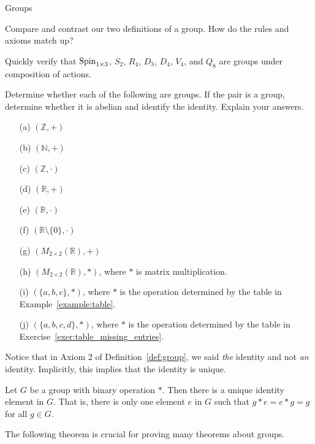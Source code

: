 \begin{section}{Groups}
\begin{exercise}
Compare and contrast our two definitions of a group.  How do the rules and axioms match up?
\end{exercise}

\begin{exercise}
Quickly verify that \(\operatorname{Spin}_{1\times 3}\), \(S_2\), \(R_4\), \(D_3\), \(D_4\), \(V_4\), and \(Q_8\) are groups under composition of actions.
\end{exercise}

\begin{exercise}
Determine whether each of the following are groups.  If the pair is a group, determine whether it is abelian and identify the identity.  Explain your answers.
\begin{enumerate}
\item[(a)] \((\mathbb{Z},+)\)
\item[(b)] \((\mathbb{N},+)\)
\item[(c)] \((\mathbb{Z},\cdot)\)
\item[(d)] \((\mathbb{R},+)\)
\item[(e)] \((\mathbb{R},\cdot)\)
\item[(f)] \((\mathbb{R}\setminus \{0\},\cdot)\)
\item[(g)] \((M_{2\times 2}(\mathbb{R}),+)\)
\item[(h)] \((M_{2\times 2}(\mathbb{R}),*)\), where \(*\) is matrix multiplication.
\item[(i)] \((\{a,b,c\},*)\), where \(*\) is the operation determined by the table in Example~\ref{example:table}.
\item[(j)] \((\{a,b,c,d\},*)\), where \(*\) is the operation determined by the table in Exercise~\ref{exer:table_missing_entries}.
\end{enumerate}
\end{exercise}

Notice that in Axiom 2 of Definition~\ref{def:group}, we said \emph{the} identity and not \emph{an} identity.  Implicitly, this implies that the identity is unique.

\begin{theorem}\label{thm:unique_id}
Let \(G\) be a group with binary operation \(*\).  Then there is a unique identity element in \(G\).  That is, there is only one element \(e\) in \(G\) such that \(g*e=e*g=g\) for all \(g\in G\).
\end{theorem}

The following theorem is crucial for proving many theorems about groups.


\end{section}
